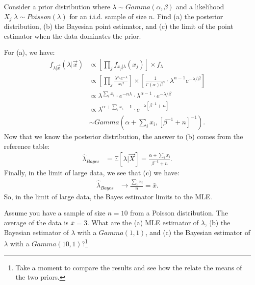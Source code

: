 
Consider a prior distribution where $\lambda \sim Gamma(\alpha, \beta)$ and a 
likelihood $X_j|\lambda \sim Poisson(\lambda)$ for an i.i.d. sample of size $n$.
Find (a) the posterior distribution, (b) the Bayesian point estimator, and (c) the
limit of the point estimator when the data dominates the prior.


For (a), we have:
\begin{align*}
f_{\lambda | \vec{x}}(\lambda | \vec{x}) 
&\propto \left[ \prod_j f_{x_j|\lambda}(x_j) \right] \times f_{\lambda} \\
&\propto \left[ \prod_j \frac{\lambda^{x_i} e^{-\lambda}}{x_i!} \right] \times \left[ \frac{1}{\Gamma(\alpha) \beta^{\alpha}} \cdot \lambda^{\alpha - 1} e^{-\lambda/\beta} \right] \\
&\propto \lambda^{\sum_i x_i} \cdot e^{-n\lambda} \cdot \lambda^{\alpha - 1} \cdot e^{-\lambda/\beta} \\
&\propto \lambda^{\alpha + \sum_i x_i - 1} \cdot e^{-\lambda [\beta^{-1} + n]} \\
&\sim Gamma(\alpha + \sum_i x_i, [\beta^{-1} + n]^{-1}).
\end{align*}
Now that we know the posterior distribution, the answer to (b) comes from the
reference table:
\begin{align*}
\hat{\lambda}_{Bayes} &= \mathbb{E}[ \lambda | \vec{X} ] = \frac{\alpha + \sum_i x_i}{\beta^{-1} + n}.
\end{align*}
Finally, in the limit of large data, we see that (c) we have:
\begin{align*}
\hat{\lambda}_{Bayes} &\rightarrow \frac{\sum_i x_i}{n} = \bar{x}.
\end{align*}
So, in the limit of large data, the Bayes estimator limits to the MLE.


Assume you have a sample of size $n = 10$ from a Poisson distribution. The 
average of the data is $\bar{x} = 3$. What are the (a) MLE estimator of $\lambda$,
(b) the Bayesian estimator of $\lambda$ with a $Gamma(1, 1)$, and (c) the
Bayesian estimator of $\lambda$ with a $Gamma(10, 1)$?\footnote{
  Take a moment to compare the results and see how the relate the means of the
  two priors.
}


